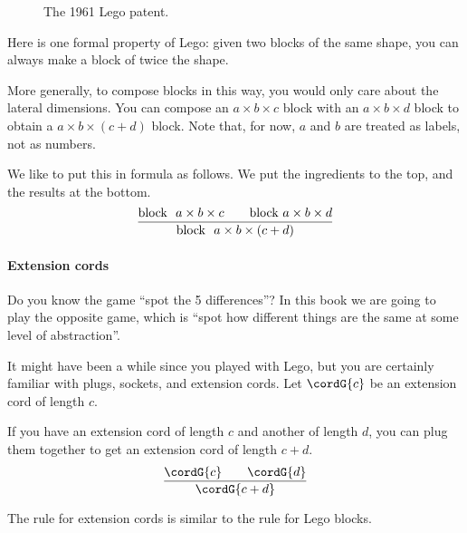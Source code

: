  




\begin{figure}[p]
  \centering
%
  \caption{The 1961 Lego patent.}
\end{figure}
Here is one formal property of Lego: given two blocks of the same shape, you can always make a block of twice the shape.

More generally, to compose blocks in this way, you would only care about the lateral dimensions.
You can compose an $a \times b \times c$ block with an  $a \times b \times d$ block to obtain a  $a \times b \times( c + d)$ block.
Note that, for now, $a$ and $b$ are treated as labels, not as numbers.

We like to put this in formula as follows. We put the ingredients to the top, and the results at the bottom.
%
\begin{equation}
  \frac{\text{block }\ a \times b \times c \qquad\text{block}\ a \times b \times d }{%
    \text{block }\ a \times b \times (c+d)%
  }
\end{equation}

\paragraph{Extension cords}

Do you know the game ``spot the 5 differences''? In this book we are going to play the opposite game, which is ``spot how different things are the same at some level of abstraction''.

It might have been a while since you played with Lego, but you are certainly familiar with plugs, sockets, and extension cords.
Let $\cordG{c}$ be an extension cord of length $c$.

If you have an extension cord of length $c$ and another of length $d$, you can plug them together to get an extension cord of length $c+d$.
%
\begin{equation}
  \frac{\cordG{c} \qquad \cordG{d} }{%
    \cordG{c+d}%
  }
\end{equation}

The rule for extension cords is similar to the rule for Lego blocks.
%


